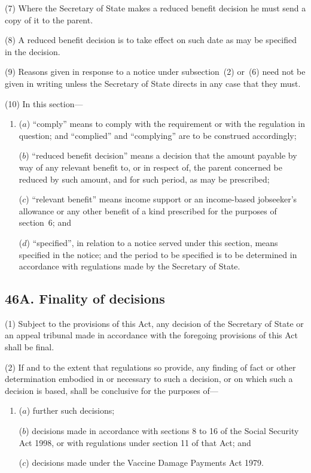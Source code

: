 \documentclass[12pt,a4paper]{article}
\begin{document}
(7) Where the Secretary of State makes a reduced benefit decision he must send a copy of it to the parent.

(8) A reduced benefit decision is to take effect on such date as may be specified in the decision.

(9) Reasons given in response to a notice under subsection~(2)  or~(6)  need not be given in writing unless the Secretary of State directs in any case that they must.

(10) In this section—
\begin{enumerate}\item[]
($a$) “comply” means to comply with the requirement or with the regulation in question; and “complied” and “complying” are to be construed accordingly;

($b$) “reduced benefit decision” means a decision that the amount payable by way of any relevant benefit to, or in respect of, the parent concerned be reduced by such amount, and for such period, as may be prescribed;

($c$) “relevant benefit” means income support or an income-based jobseeker’s allowance or any other benefit of a kind prescribed for the purposes of section~6; and

($d$) “specified”, in relation to a notice served under this section, means specified in the notice; and the period to be specified is to be determined in accordance with regulations made by the Secretary of State.
\end{enumerate}


\subsection{46A. Finality of decisions}

(1) Subject to the provisions of this Act, any decision of the Secretary of State or an appeal tribunal made in accordance with the foregoing provisions of this Act shall be final.

(2) If and to the extent that regulations so provide, any finding of fact or other determination embodied in or necessary to such a decision, or on which such a decision is based, shall be conclusive for the purposes of—
\begin{enumerate}\item[]
($a$) further such decisions;

($b$) decisions made in accordance with sections 8 to 16 of the Social Security Act 1998, or with regulations under section 11 of that Act; and

($c$) decisions made under the Vaccine Damage Payments Act 1979.
\end{enumerate}
\end{document}
